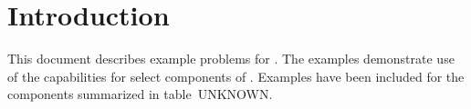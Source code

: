 \section{Introduction}

This document describes example problems for \mf. The examples demonstrate use of the capabilities for select components of \mf. Examples have been included for the \mf components summarized in table~UNKNOWN.


